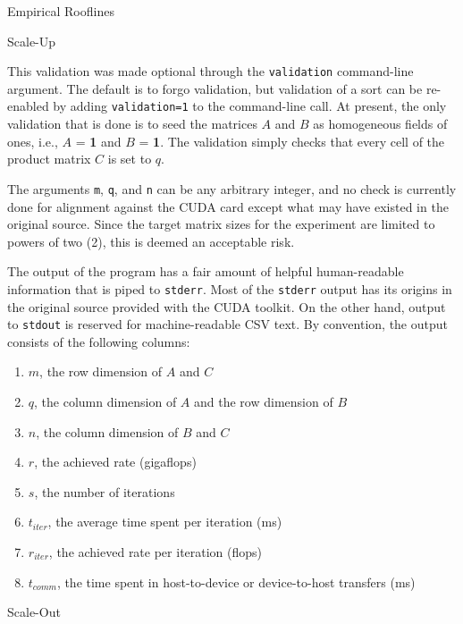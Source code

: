 \documentclass{article}
\begin{document}
\begin{section}{Empirical Rooflines}
\begin{subsection}{Scale-Up}
\begin{paragraph}{}
      This validation was made optional through the \texttt{validation} command-line argument. The default is to forgo validation, but validation of a sort
      can be re-enabled by adding \texttt{validation=1} to the command-line call. At present, the only validation that is done is to seed the matrices $A$
      and $B$ as homogeneous fields of ones, i.e., $A$ = \textbf{1} and $B$ = \textbf{1}. The validation simply checks that every cell of the product matrix
      $C$ is set to $q$.
    \end{paragraph}
    \begin{paragraph}{}
      The arguments \texttt{m}, \texttt{q}, and \texttt{n} can be any arbitrary integer, and no check is currently done for alignment against the CUDA card
      except what may have existed in the original source. Since the target matrix sizes for the experiment are limited to powers of two (2), this is deemed
      an acceptable risk.
    \end{paragraph}
    \begin{paragraph}{}
      The output of the program has a fair amount of helpful human-readable information that is piped to \texttt{stderr}. Most of the \texttt{stderr} output
      has its origins in the original source provided with the CUDA toolkit. On the other hand, output to \texttt{stdout} is reserved for machine-readable CSV text. 
      By convention, the output consists of the following columns:
      \begin{enumerate}
      \item{$m$, the row dimension of $A$ and $C$}
      \item{$q$, the column dimension of $A$ and the row dimension of $B$}
      \item{$n$, the column dimension of $B$ and $C$}
      \item{$r$, the achieved rate (gigaflops)}
      \item{$s$, the number of iterations}
      \item{$t_{iter}$, the average time spent per iteration (ms)}
      \item{$r_{iter}$, the achieved rate per iteration (flops)}
      \item{$t_{comm}$, the time spent in host-to-device or device-to-host transfers (ms)}
      \end{enumerate}
    \end{paragraph}
  \end{subsection}
  \begin{subsection}{Scale-Out}

\end{subsection}
\end{section}
\end{document}
